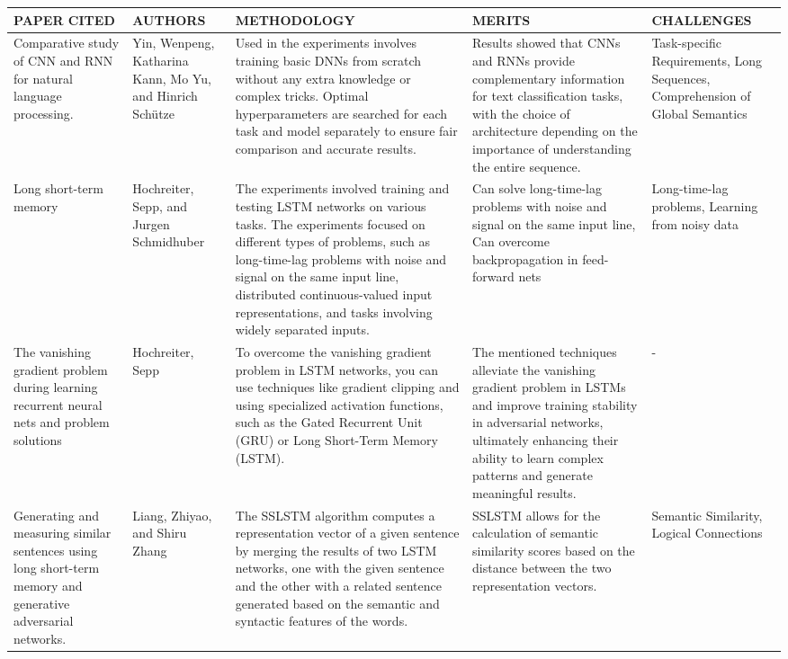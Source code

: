 \documentclass[conference]{IEEEtran}
\begin{document}
\begin{table}
\begin{center}
 \centering
    \begin{tabular}{ |p{2cm}|p{2cm}|p{4cm}|p{3cm}|p{4cm}| }
\hline
\centering PAPER CITED & \centering  AUTHORS & \centering METHODOLOGY &  \centering MERITS &  \centering CHALLENGES \arraybackslash \\ 
\hline
[14] Comparative study of CNN and RNN for natural language processing. &  Yin, Wenpeng, Katharina Kann, Mo Yu, and Hinrich Schütze &  Used in the experiments involves training basic DNNs from scratch without any extra knowledge or complex tricks. Optimal hyperparameters are searched for each task and model separately to ensure fair comparison and accurate results. &  Results showed that CNNs and RNNs provide complementary information for text classification tasks, with the choice of architecture depending on the importance of understanding the entire sequence. &  Task-specific Requirements, Long Sequences, Comprehension of Global Semantics  \\
\hline
[15] Long short-term memory &  Hochreiter, Sepp, and Jurgen Schmidhuber & The experiments involved training and testing LSTM networks on various tasks. The experiments focused on different types of problems, such as long-time-lag problems with noise and signal on the same input line, distributed continuous-valued input representations, and tasks involving widely separated inputs. & Can solve long-time-lag problems with noise and signal on the same input line, Can overcome backpropagation in feed-forward nets &  Long-time-lag problems, Learning from noisy data  \\
\hline
[16] The vanishing gradient problem during learning recurrent neural nets and problem solutions &  Hochreiter, Sepp &  To overcome the vanishing gradient problem in LSTM networks, you can use techniques like gradient clipping and using specialized activation functions, such as the Gated Recurrent Unit (GRU) or Long Short-Term Memory (LSTM). &  The mentioned techniques alleviate the vanishing gradient problem in LSTMs and improve training stability in adversarial networks, ultimately enhancing their ability to learn complex patterns and generate meaningful results. & -  \\
\hline
[17] Generating and measuring similar sentences using long short-term memory and generative adversarial networks. &  Liang, Zhiyao, and Shiru Zhang &  The SSLSTM algorithm computes a representation vector of a given sentence by merging the results of two LSTM networks, one with the given sentence and the other with a related sentence generated based on the semantic and syntactic features of the words. &  SSLSTM allows for the calculation of semantic similarity scores based on the distance between the two representation vectors. &  Semantic Similarity, Logical Connections  \\

\end{tabular}
\end{center}
\end{table}
\end{document}
